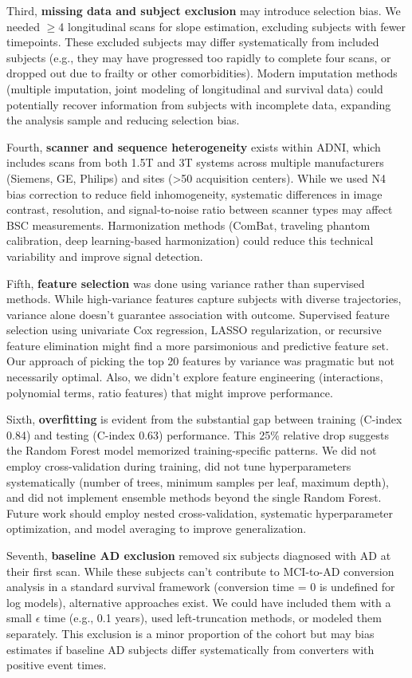 \documentclass[blue]{ludusofficial}  %
\begin{document}
Third, \textbf{missing data and subject exclusion} may introduce selection bias. We needed $\geq$4 longitudinal scans for slope estimation, excluding subjects with fewer timepoints. These excluded subjects may differ systematically from included subjects (e.g., they may have progressed too rapidly to complete four scans, or dropped out due to frailty or other comorbidities). Modern imputation methods (multiple imputation, joint modeling of longitudinal and survival data) could potentially recover information from subjects with incomplete data, expanding the analysis sample and reducing selection bias.

Fourth, \textbf{scanner and sequence heterogeneity} exists within ADNI, which includes scans from both 1.5T and 3T systems across multiple manufacturers (Siemens, GE, Philips) and sites (>50 acquisition centers). While we used N4 bias correction to reduce field inhomogeneity, systematic differences in image contrast, resolution, and signal-to-noise ratio between scanner types may affect BSC measurements. Harmonization methods (ComBat, traveling phantom calibration, deep learning-based harmonization) could reduce this technical variability and improve signal detection.

Fifth, \textbf{feature selection} was done using variance rather than supervised methods. While high-variance features capture subjects with diverse trajectories, variance alone doesn't guarantee association with outcome. Supervised feature selection using univariate Cox regression, LASSO regularization, or recursive feature elimination might find a more parsimonious and predictive feature set. Our approach of picking the top 20 features by variance was pragmatic but not necessarily optimal. Also, we didn't explore feature engineering (interactions, polynomial terms, ratio features) that might improve performance.

Sixth, \textbf{overfitting} is evident from the substantial gap between training (C-index 0.84) and testing (C-index 0.63) performance. This 25\% relative drop suggests the Random Forest model memorized training-specific patterns. We did not employ cross-validation during training, did not tune hyperparameters systematically (number of trees, minimum samples per leaf, maximum depth), and did not implement ensemble methods beyond the single Random Forest. Future work should employ nested cross-validation, systematic hyperparameter optimization, and model averaging to improve generalization.

Seventh, \textbf{baseline AD exclusion} removed six subjects diagnosed with AD at their first scan. While these subjects can't contribute to MCI-to-AD conversion analysis in a standard survival framework (conversion time = 0 is undefined for log models), alternative approaches exist. We could have included them with a small $\epsilon$ time (e.g., 0.1 years), used left-truncation methods, or modeled them separately. This exclusion is a minor proportion of the cohort but may bias estimates if baseline AD subjects differ systematically from converters with positive event times.
\end{document}

